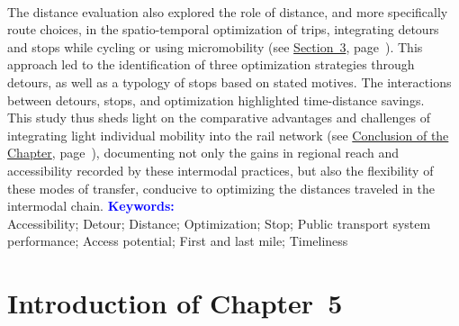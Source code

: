 \begin{refsegment}
\begin{tcolorbox}
{    \\
The distance evaluation also explored the role of distance, and more specifically route choices, in the spatio-temporal optimization of trips, integrating detours and stops while cycling or using micromobility (see \hyperref[chap5:detours-pauses-optimisation]{Section~3}, page~\pageref{chap5:detours-pauses-optimisation}). This approach led to the identification of three optimization strategies through detours, as well as a typology of stops based on stated motives. The interactions between detours, stops, and optimization highlighted time-distance savings.%
    \\
This study thus sheds light on the comparative advantages and challenges of integrating light individual mobility into the rail network (see \hyperref[chap5:conclusion]{Conclusion of the Chapter}, page~\pageref{chap5:conclusion}), documenting not only the gains in regional reach and accessibility recorded by these intermodal practices, but also the flexibility of these modes of transfer, conducive to optimizing the distances traveled in the intermodal chain.%
    }
    \tcblower
\Large{\textcolor{blue}{\textbf{Keywords:}}}
    \\
    \small{
Accessibility;
Detour;
Distance;
Optimization;
Stop;
Public transport system performance;
Access potential;
First and last mile;
Timeliness
    }
\end{tcolorbox}

\newpage
{} %
\section*{Introduction of Chapter~5
    \label{chap5:introduction}
    }


\end{refsegment}

